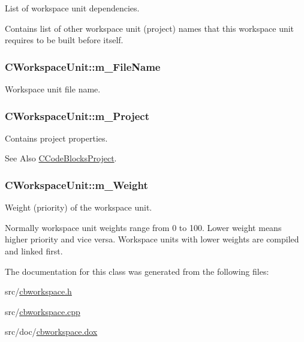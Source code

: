 List of workspace unit dependencies. 

Contains list of other workspace unit (project) names that this workspace unit requires to be built before itself. \hypertarget{classCWorkspaceUnit_a7e229a4a570c2ac60165969ad85e14c3}{
\subsubsection[{m\-\_\-\-File\-Name}]{\setlength{\rightskip}{0pt plus 5cm}C\-Workspace\-Unit\-::m\-\_\-\-File\-Name\hspace{0.3cm}{\ttfamily [private]}}}\label{classCWorkspaceUnit_a7e229a4a570c2ac60165969ad85e14c3}


Workspace unit file name. 

\hypertarget{classCWorkspaceUnit_a07129425366054f78a5416c09a028c26}{
\subsubsection[{m\-\_\-\-Project}]{\setlength{\rightskip}{0pt plus 5cm}C\-Workspace\-Unit\-::m\-\_\-\-Project\hspace{0.3cm}{\ttfamily [private]}}}\label{classCWorkspaceUnit_a07129425366054f78a5416c09a028c26}


Contains project properties. 

\begin{DoxySeeAlso}{See Also}
\hyperlink{classCCodeBlocksProject}{C\-Code\-Blocks\-Project}. 
\end{DoxySeeAlso}
\hypertarget{classCWorkspaceUnit_a12fe48bb00386ea645fe3e7f699fd967}{
\subsubsection[{m\-\_\-\-Weight}]{\setlength{\rightskip}{0pt plus 5cm}C\-Workspace\-Unit\-::m\-\_\-\-Weight\hspace{0.3cm}{\ttfamily [private]}}}\label{classCWorkspaceUnit_a12fe48bb00386ea645fe3e7f699fd967}


Weight (priority) of the workspace unit. 

Normally workspace unit weights range from 0 to 100. Lower weight means higher priority and vice versa. Workspace units with lower weights are compiled and linked first. 

The documentation for this class was generated from the following files\-:\begin{DoxyCompactItemize}
\item 
src/\hyperlink{cbworkspace_8h}{cbworkspace.\-h}\item 
src/\hyperlink{cbworkspace_8cpp}{cbworkspace.\-cpp}\item 
src/doc/\hyperlink{cbworkspace_8dox}{cbworkspace.\-dox}\end{DoxyCompactItemize}
